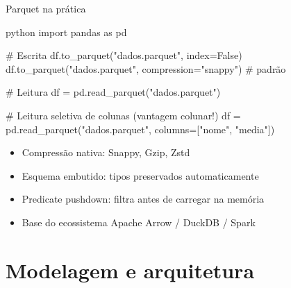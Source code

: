 \documentclass[xcolor=dvipsnames,t,aspectratio=169]{beamer}
\newcommand{\highlight}[1]{{\color{nes_dark_orange} #1}}
\begin{document}
\begin{frame}[c, fragile]{Parquet na prática}

\begin{code}{python}
import pandas as pd

# Escrita
df.to_parquet("dados.parquet", index=False)
df.to_parquet("dados.parquet", compression="snappy")  # padrão

# Leitura
df = pd.read_parquet("dados.parquet")

# Leitura seletiva de colunas (vantagem colunar!)
df = pd.read_parquet("dados.parquet", columns=["nome", "media"])
\end{code}

\begin{itemize}
    \item \highlight{Compressão nativa}: Snappy, Gzip, Zstd
    \item \highlight{Esquema embutido}: tipos preservados automaticamente
    \item \highlight{Predicate pushdown}: filtra antes de carregar na memória
    \item Base do ecossistema Apache Arrow / DuckDB / Spark
\end{itemize}

\end{frame}







\section{Modelagem e arquitetura}
\end{document}
